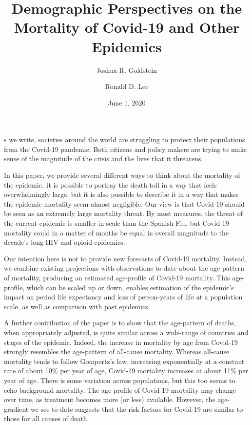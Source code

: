 \documentclass[9pt,twocolumn,twoside,lineno]{pnas-new}
\title{Demographic Perspectives on the Mortality of Covid-19 and Other
  Epidemics}
\date{June 1, 2020}
\author[a,1]{Joshua R. Goldstein}
\author[a,1,2]{Ronald D. Lee}
\affil[a]{Department of Demography, UC Berkeley}
\begin{document}
\maketitle
\thispagestyle{firststyle}
 

s we write, societies around the world are struggling to
protect their populations from the Covid-19 pandemic. Both citizens
and policy makers are trying to make sense of the magnitude of the
crisis and the lives that it threatens.

In this paper, we provide several different ways to think about the
mortality of the epidemic. It is possible to portray the death toll in
a way that feels overwhelmingly large, but it is also possible to
describe it in a way that makes the epidemic mortality seem almost
negligible. Our view is that Covid-19 should be seen as an extremely
large mortality threat. By most measures, the threat of the current
epidemic is smaller in scale than the Spanish Flu, but Covid-19
mortality could in a matter of months be equal in overall
magnitude to the decade's long HIV and opioid epidemics.

Our intention here is not to provide new forecasts of Covid-19
mortality. Instead, we combine existing projections with observations
to date about the age pattern of mortality, producing an estimated
age-profile of Covid-19 mortality. This age-profile, which can be
scaled up or down, enables estimation of the epidemic’s impact on
period life expectancy and loss of person-years of life at a
population scale, as well as comparison with past epidemics.

A further contribution of the paper is to show that the age-pattern of
deaths, when appropriately adjusted, is quite similar across a
wide-range of countries and stages of the epidemic. Indeed, the
increase in mortality by age from Covid-19 strongly resembles
the age-pattern of all-cause mortality. Whereas all-cause mortality
tends to follow Gompertz's law, increasing exponentially at a constant
rate of about 10\% per year of age, Covid-19 mortality increases at
about 11\% per year of age. There is some variation across
populations, but this too seems to echo background mortality. 
The age-profile of Covid-19 mortality may change over time, as
treatment becomes more (or less) available. However, the age-gradient
we see to date suggests that the risk factors for Covid-19 are similar
to those for all causes of death.
\end{document}
